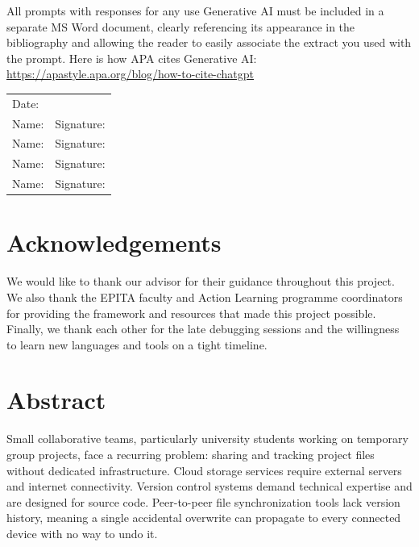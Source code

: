 \documentclass[12pt,oneside]{report}
\begin{document}
All prompts with responses for any use Generative AI must be included in a separate MS Word document, clearly referencing its appearance in the bibliography and allowing the reader to easily associate the extract you used with the prompt. Here is how APA cites Generative AI: \url{https://apastyle.apa.org/blog/how-to-cite-chatgpt}

\vspace{0.8cm}

\begin{tabular}{p{6cm} p{6cm}}
Date: \underline{\hspace{4cm}} & \\[0.8cm]
Name: \underline{\hspace{4cm}} & Signature: \underline{\hspace{4cm}} \\[0.6cm]
Name: \underline{\hspace{4cm}} & Signature: \underline{\hspace{4cm}} \\[0.6cm]
Name: \underline{\hspace{4cm}} & Signature: \underline{\hspace{4cm}} \\[0.6cm]
Name: \underline{\hspace{4cm}} & Signature: \underline{\hspace{4cm}} \\[0.6cm]
\end{tabular}

\newpage
\chapter*{Acknowledgements}

We would like to thank our advisor for their guidance throughout this project. We also thank the EPITA faculty and Action Learning programme coordinators for providing the framework and resources that made this project possible. Finally, we thank each other for the late debugging sessions and the willingness to learn new languages and tools on a tight timeline.

\newpage
\chapter*{Abstract}

Small collaborative teams, particularly university students working on temporary group projects, face a recurring problem: sharing and tracking project files without dedicated infrastructure. Cloud storage services require external servers and internet connectivity. Version control systems demand technical expertise and are designed for source code. Peer-to-peer file synchronization tools lack version history, meaning a single accidental overwrite can propagate to every connected device with no way to undo it.
\end{document}
